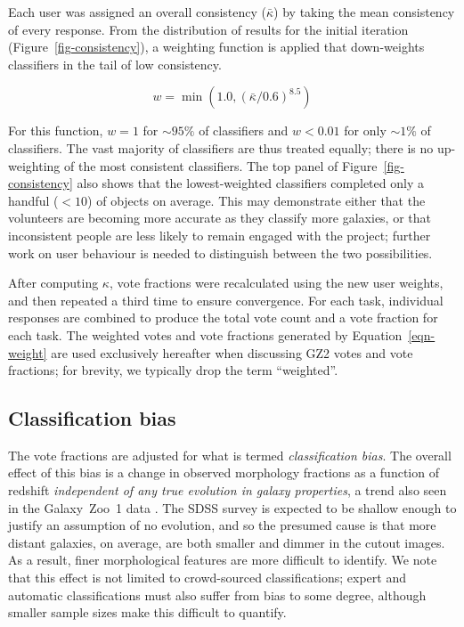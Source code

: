 \documentclass[useAMS,usenatbib]{mn2e}
\begin{document}
Each user was assigned an overall consistency ($\bar{\kappa}$) by taking the mean consistency of every response. From the distribution of results for the initial iteration (Figure~\ref{fig-consistency}), a weighting function is applied that down-weights classifiers in the tail of low consistency.

\begin{equation}
w = \min \left(1.0,(\bar{\kappa} / 0.6)^{8.5} \right)
\label{eqn-weight}
\end{equation}

\noindent For this function, $w=1$ for $\sim95\%$ of classifiers and $w<0.01$ for only $\sim1\%$ of classifiers. The vast majority of classifiers are thus treated equally; there is no up-weighting of the most consistent classifiers. The top panel of Figure~\ref{fig-consistency} also shows that the lowest-weighted classifiers completed only a handful ($<10$) of objects on average. This may demonstrate either that the volunteers are becoming more accurate as they classify more galaxies, or that inconsistent people are less likely to remain engaged with the project; further work on user behaviour is needed to distinguish between the two possibilities.

After computing $\kappa$, vote fractions were recalculated using the new user weights, and then repeated a third time to ensure convergence. For each task, individual responses are combined to produce the total vote count and a vote fraction for each task. The weighted votes and vote fractions generated by Equation~\ref{eqn-weight} are used exclusively hereafter when discussing GZ2 votes and vote fractions; for brevity, we typically drop the term ``weighted''. 

\subsection{Classification bias}\label{ssec-classificationbias}

The vote fractions are adjusted for what is termed {\it classification bias}. The overall effect of this bias is a change in observed morphology fractions as a function of redshift {\em independent of any true evolution in galaxy properties}, a trend also seen in the Galaxy~Zoo~1 data \citep{bam09}. The SDSS survey is expected to be shallow enough to justify an assumption of no evolution, and so the presumed cause is that more distant galaxies, on average, are both smaller and dimmer in the cutout images. As a result, finer morphological features are more difficult to identify. We note that this effect is not limited to crowd-sourced classifications; expert and automatic classifications must also suffer from bias to some degree, although smaller sample sizes make this difficult to quantify. 
\end{document}
